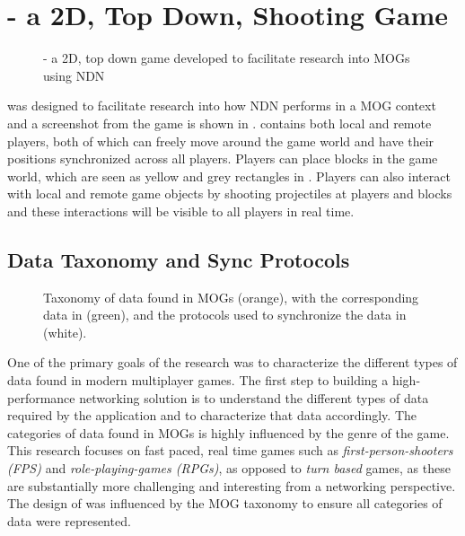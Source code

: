 \section{\game{} - a 2D, Top Down, Shooting Game}
\begin{figure}
    \centering
    \caption{\game{} - a 2D, top down game developed to facilitate research into MOGs using NDN}
    \label{fig:des:2d-game}
\end{figure}

\game{} was designed to facilitate research into how NDN performs in a MOG context and a screenshot from the game is shown in . \game{} contains both local and remote players, both of which can freely move around the game world and have their positions synchronized across all players. Players can place blocks in the game world, which are seen as yellow and grey rectangles in . Players can also interact with local and remote game objects by shooting projectiles at players and blocks and these interactions will be visible to all players in real time. 




\subsection{\game{} Data Taxonomy and Sync Protocols}\label{sec:taxonomy}
\begin{figure*}
    \centering
    \par
    \caption{Taxonomy of data found in MOGs (orange), with the corresponding data in \game{} (green), and the protocols used to synchronize the data in \game{} (white).}
    \label{fig:des:taxonomy-with-data}
    \vspace*{\floatsep}
\end{figure*}%

One of the primary goals of the research was to characterize the different types of data found in modern multiplayer games. The first step to building a high-performance networking solution is to understand the different types of data required by the application and to characterize that data accordingly. The categories of data found in MOGs is highly influenced by the genre of the game. This research focuses on fast paced, real time games such as \textit{first-person-shooters (FPS)} and \textit{role-playing-games (RPGs)}, as opposed to \textit{turn based} games, as these are substantially more challenging and interesting from a networking perspective. The design of \game{} was influenced by the MOG taxonomy to ensure all categories of data were represented.


